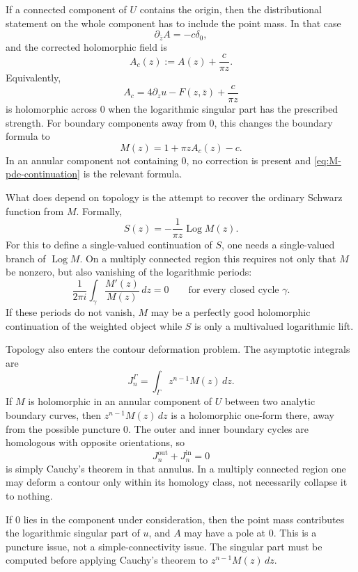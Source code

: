 \documentclass[11pt]{article}
\newcommand{\dd}{\,d}
\newcommand{\pbar}{\partial_{\bar z}}
\newcommand{\1}{\mathbf 1}
\newcommand{\Log}{\operatorname{Log}}
\begin{document}
If a connected component of \(U\) contains the origin, then the distributional statement on
the whole component has to include the point mass. In that case
\[
  \pbar A=-c\delta_0,
\]
and the corrected holomorphic field is
\[
  A_c(z):=A(z)+\frac{c}{\pi z}.
\]
Equivalently,
\[
  A_c=4\partial_z u-F(z,\bar z)+\frac{c}{\pi z}
\]
is holomorphic across \(0\) when the logarithmic singular part has the prescribed strength.
For boundary components away from \(0\), this changes the boundary formula to
\begin{equation}\label{eq:M-pde-continuation-puncture}
  M(z)=1+\pi zA_c(z)-c.
\end{equation}
In an annular component not containing \(0\), no correction is present and
\eqref{eq:M-pde-continuation} is the relevant formula.

What does depend on topology is the attempt to recover the ordinary Schwarz function from
\(M\). Formally,
\[
  S(z)=-\frac{1}{\pi z}\Log M(z).
\]
For this to define a single-valued continuation of \(S\), one needs a single-valued branch
of \(\Log M\). On a multiply connected region this requires not only that \(M\) be
nonzero, but also vanishing of the logarithmic periods:
\begin{equation}\label{eq:log-period-condition}
  \frac{1}{2\pi i}\int_\gamma \frac{M'(z)}{M(z)}\dd z=0
  \qquad
  \text{for every closed cycle }\gamma .
\end{equation}
If these periods do not vanish, \(M\) may be a perfectly good holomorphic continuation of
the weighted object while \(S\) is only a multivalued logarithmic lift.

Topology also enters the contour deformation problem. The asymptotic integrals are
\[
  J_n^\Gamma=\int_\Gamma z^{n-1}M(z)\dd z.
\]
If \(M\) is holomorphic in an annular component of \(U\) between two analytic boundary
curves, then \(z^{n-1}M(z)\dd z\) is a holomorphic one-form there, away from the possible
puncture \(0\). The outer and inner boundary cycles are homologous with opposite
orientations, so
\[
  J_n^{\mathrm{out}}+J_n^{\mathrm{in}}=0
\]
is simply Cauchy's theorem in that annulus. In a multiply connected region one may deform a
contour only within its homology class, not necessarily collapse it to nothing.

If \(0\) lies in the component under consideration, then the point mass contributes the
logarithmic singular part of \(u\), and \(A\) may have a pole at \(0\). This is a puncture
issue, not a simple-connectivity issue. The singular part must be computed before applying
Cauchy's theorem to \(z^{n-1}M(z)\dd z\).
\end{document}
